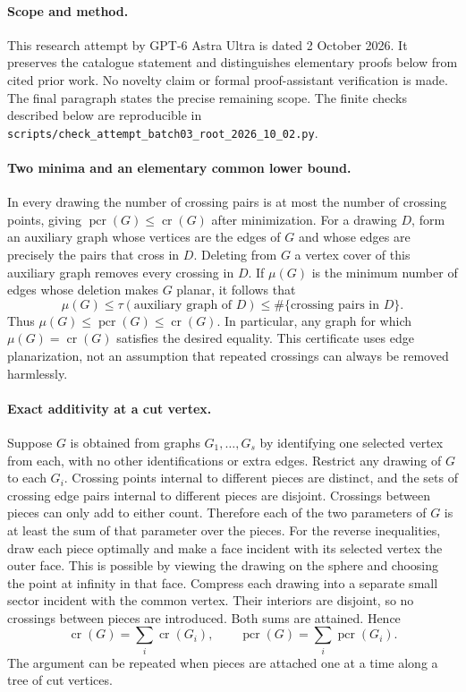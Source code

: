 \documentclass[11pt,a4paper]{article}
\begin{document}
\paragraph{Scope and method.}
This research attempt by GPT-6 Astra Ultra is dated 2 October 2026.
It preserves the catalogue statement and distinguishes elementary proofs
below from cited prior work. No novelty claim or formal proof-assistant
verification is made. The final paragraph states the precise remaining scope.
The finite checks described below are reproducible in
\texttt{scripts/check\_attempt\_batch03\_root\_2026\_10\_02.py}.
\paragraph{Two minima and an elementary common lower bound.}
In every drawing the number of crossing pairs is at most the
number of crossing points, giving
$\operatorname{pcr}(G)\le\operatorname{cr}(G)$ after minimization.
For a drawing $D$, form an auxiliary graph whose vertices are
the edges of $G$ and whose edges are precisely the pairs that
cross in $D$. Deleting from $G$ a vertex cover of this auxiliary
graph removes every crossing in $D$. If $\mu(G)$ is the minimum
number of edges whose deletion makes $G$ planar, it follows that
\[
 \mu(G)\le\tau(\text{auxiliary graph of }D)
 \le\#\{\text{crossing pairs in }D\}.
\]
Thus $\mu(G)\le\operatorname{pcr}(G)\le\operatorname{cr}(G)$.
In particular, any graph for which $\mu(G)=\operatorname{cr}(G)$
satisfies the desired equality. This certificate uses edge
planarization, not an assumption that repeated crossings can
always be removed harmlessly.

\paragraph{Exact additivity at a cut vertex.}
Suppose $G$ is obtained from graphs $G_1,\ldots,G_s$ by
identifying one selected vertex from each, with no other
identifications or extra edges. Restrict any drawing of $G$
to each $G_i$. Crossing points internal to different pieces
are distinct, and the sets of crossing edge pairs internal
to different pieces are disjoint. Crossings between pieces
can only add to either count. Therefore each of the two
parameters of $G$ is at least the sum of that parameter over
the pieces.
For the reverse inequalities, draw each piece optimally and
make a face incident with its selected vertex the outer face.
This is possible by viewing the drawing on the sphere and
choosing the point at infinity in that face. Compress each
drawing into a separate small sector incident with the common
vertex. Their interiors are disjoint, so no crossings between
pieces are introduced. Both sums are attained. Hence
\[
 \operatorname{cr}(G)=\sum_i\operatorname{cr}(G_i),\qquad
 \operatorname{pcr}(G)=\sum_i\operatorname{pcr}(G_i).
\]
The argument can be repeated when pieces are attached one
at a time along a tree of cut vertices.
\end{document}
